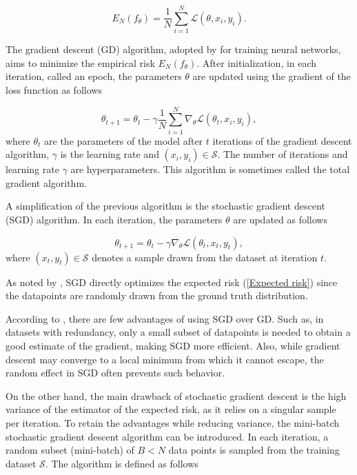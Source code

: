 \begin{equation*}
	E_N(f_\theta) = \frac{1}{N} \sum_{i=1}^{N} \mathcal{L}(\theta,x_i,y_i).
\end{equation*}

The gradient descent (GD) algorithm, adopted by \cite{Rumelhart1986} for training neural networks, aims to minimize the empirical risk $E_N(f_\theta)$. After initialization, in each iteration, called an epoch, the parameters $\theta$ are updated using the gradient of the loss function as follows

\begin{equation*}
	\theta_{t+1} = \theta_t - \gamma \frac{1}{N} \sum_{i=1}^{N} \nabla_\theta \mathcal{L}(\theta_t,x_i,y_i),
\end{equation*}
where $\theta_t$ are the parameters of the model after $t$ iterations of the gradient descent algorithm, $\gamma$ is the learning rate and $(x_i,y_i) \in \mathcal{S}$. The number of iterations and learning rate $\gamma$ are hyperparameters. This algorithm is sometimes called the total gradient algorithm. 

A simplification of the previous algorithm is the stochastic gradient descent (SGD) algorithm. In each iteration, the parameters $\theta$ are updated as follows

\begin{equation*}
	\theta_{t+1} = \theta_t - \gamma \nabla_\theta \mathcal{L}(\theta_t,x_t,y_t),
\end{equation*} 
where $(x_t, y_t) \in \mathcal{S}$ denotes a sample drawn from the dataset at iteration $t$.

As noted by \cite{Bottou2010}, SGD directly optimizes the expected risk (\ref{Expected risk}) since the datapoints are randomly drawn from the ground truth distribution.

According to \cite{Bottou1991}, there are few advantages of using SGD over GD. Such as, in datasets with redundancy, only a small subset of datapoints is needed to obtain a good estimate of the gradient, making SGD more efficient. Also, while gradient descent may converge to a local minimum from which it cannot escape, the random effect in SGD often prevents such behavior.

On the other hand, the main drawback of stochastic gradient descent is the high variance of the estimator of the expected risk, as it relies on a singular sample per iteration. To retain the advantages while reducing variance, the mini-batch stochastic gradient descent algorithm can be introduced. In each iteration, a random subset (mini-batch) of $B < N$ data points is sampled from the training dataset $\mathcal{S}$. The algorithm is defined as follows

